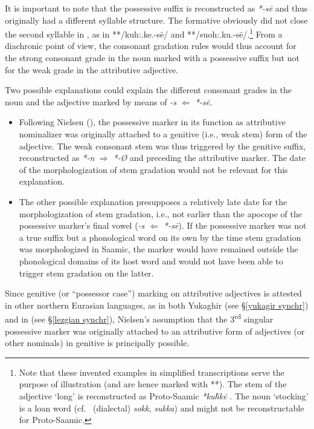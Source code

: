 {It is important to note that the possessive suffix is reconstructed as  \textit{*-sē} \cite[73]{sammallahti1998b} and thus originally had a different syllable structure. The formative obviously did not close the second syllable in , as in **/kuh:.ke.-sē/ and **/suoh:.ku.-sē/.\footnote{Note that these invented examples in simplified transcriptions serve the purpose of illustration (and are hence marked with **). The stem of the adjective ‘long’ is reconstructed as Proto\hyp{}Saamic \textit{*ku\`{h}kē} \cite[246]{sammallahti1998b}. The noun ‘stocking’ is a loan word (cf.~ (dialectal) \textit{sokk},  \textit{sukka}) and might not be reconstructable for Proto\hyp{}Saamic.} From a diachronic point of view, the consonant gradation rules would thus account for the strong consonant grade in the noun marked with a possessive suffix but not for the weak grade in the attributive adjective.
 
Two possible explanations could explain the different consonant grades in the noun and the adjective marked by means of \textit{-s} $\Leftarrow$ \textit{*-sē}.
\begin{itemize}
\item Following Nielsen (\citeyear{nielsen1945b}), the possessive marker in its function as attributive nominalizer was originally attached to a genitive (i.e., weak stem) form of the adjective. The weak consonant stem was thus triggered by the genitive suffix, reconstructed as  \textit{*-n} $\Rightarrow$  \mbox{\textit{*-Ø}} \cite[65]{sammallahti1998b} and preceding the attributive marker. The date of the morphologization of stem gradation would not be relevant for this explanation.
\item The other possible explanation presupposes a relatively late date for the morphologization of stem gradation, i.e., not earlier than the apocope of the possessive marker's final vowel (\textit{-s $\Leftarrow$ *-sē}). If the possessive marker was not a true suffix but a phonological word on its own by the time stem gradation was morphologized in Saamic, the marker would have remained outside the phonological domains of its host word and would not have been able to trigger stem gradation on the latter. 
\end{itemize}
Since genitive (or “possessor case”) marking on attributive adjectives is attested in other northern Eurasian languages, as in both Yukaghir (see \S\ref{yukagir synchr}) and in  (see \S\ref{lezgian synchr}), Nielsen's assumption that the 3\textsuperscript{rd} singular possessive marker was originally attached to an attributive form of adjectives (or other nominals) in genitive is principally possible.

}
